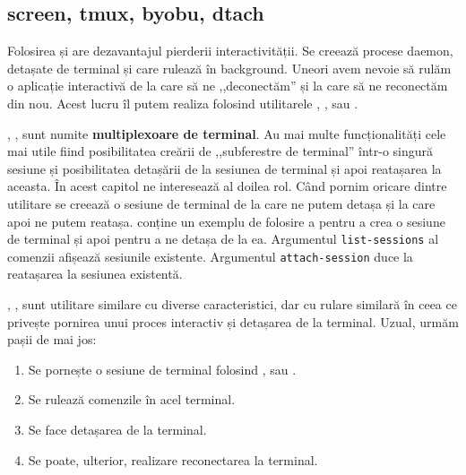 \subsection{screen, tmux, byobu, dtach}
\label{sec:process:screen-tmux}

Folosirea  și  are dezavantajul pierderii interactivității. Se
creează procese daemon, detașate de terminal și care rulează în background.
Uneori avem nevoie să rulăm o aplicație interactivă de la care să ne
,,deconectăm'' și la care să ne reconectăm din nou. Acest lucru îl putem realiza
folosind utilitarele , ,  sau .

, ,  sunt numite \textbf{multiplexoare de terminal}. Au mai multe funcționalități cele mai utile fiind
posibilitatea creării de ,,subferestre de terminal'' într-o singură sesiune și
posibilitatea detașării de la sesiunea de terminal și apoi reatașarea la
aceasta. În acest capitol ne interesează al doilea rol. Când pornim oricare dintre utilitare
se creează o sesiune de terminal de la care ne putem detașa și la care apoi ne
putem reatașa.  conține un exemplu de folosire a  pentru a crea o
sesiune de terminal și apoi pentru a ne detașa de la ea.
Argumentul \texttt{list-sessions} al comenzii  afișează sesiunile existente. Argumentul \texttt{attach-session} duce la reatașarea la sesiunea existentă.


, ,  sunt utilitare similare cu diverse caracteristici, dar cu
rulare similară în ceea ce privește pornirea unui proces interactiv și detașarea
de la terminal. Uzual, urmăm pașii de mai jos:

\begin{enumerate}
  \item Se pornește o sesiune de terminal folosind ,  sau .
	\item Se rulează comenzile în acel terminal.
	\item Se face detașarea de la terminal.
	\item Se poate, ulterior, realizare reconectarea la terminal.
\end{enumerate}

